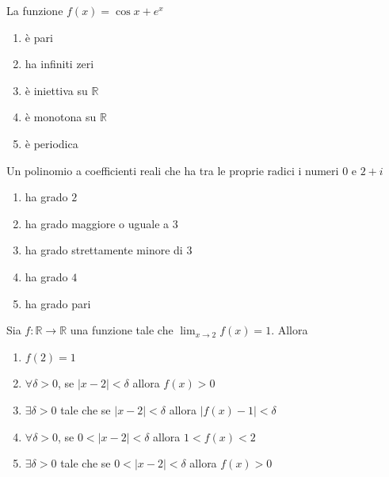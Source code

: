 \begin{quiz}
La funzione $f(x)=\cos x+e^x$
\begin{enumerate}
\item \`e pari
\item ha infiniti zeri
\item \`e iniettiva su $\mathbb R$
\item \`e monotona su $\mathbb R$
\item \`e periodica
\end{enumerate}
\end{quiz}

\begin{quiz}
Un polinomio a coefficienti reali che ha tra le proprie radici i numeri $0$ e $2+i$
\begin{enumerate}
\item ha grado $2$
\item ha grado maggiore o uguale a $3$
\item ha grado strettamente minore di $3$
\item ha grado $4$
\item ha grado pari
\end{enumerate}
\end{quiz}

\begin{quiz}
Sia $f:\mathbb R\to\mathbb R$ una funzione tale che $\lim_{x\to2}f(x)=1$. Allora
\begin{enumerate}
\item $f(2)=1$
\item $\forall\delta>0$, se $|x-2|<\delta$ allora $f(x)>0$
\item $\exists\delta>0$ tale che se $|x-2|<\delta$ allora $|f(x)-1|<\delta$
\item $\forall\delta>0$, se $0<|x-2|<\delta$ allora $1<f(x)<2$
\item $\exists\delta>0$ tale che se $0<|x-2|<\delta$ allora $f(x)>0$
\end{enumerate}
\end{quiz}

